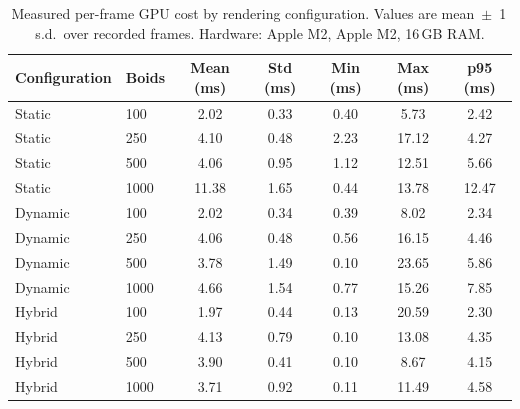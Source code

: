 \begin{table}[htbp]
  \centering
  \caption{Measured per-frame GPU cost by rendering configuration. Values are mean~$\pm$~1\,s.d.\ over recorded frames. Hardware: Apple M2, Apple M2, 16\,GB RAM.}
  \label{tab:frame-cost}
  \begin{tabular}{llccccc}
    \toprule
    \textbf{Configuration} & \textbf{Boids} & \textbf{Mean (ms)} & \textbf{Std (ms)} & \textbf{Min (ms)} & \textbf{Max (ms)} & \textbf{p95 (ms)} \\
    \midrule
    Static & 100 & 2.02 & 0.33 & 0.40 & 5.73 & 2.42 \\
    Static & 250 & 4.10 & 0.48 & 2.23 & 17.12 & 4.27 \\
    Static & 500 & 4.06 & 0.95 & 1.12 & 12.51 & 5.66 \\
    Static & 1000 & 11.38 & 1.65 & 0.44 & 13.78 & 12.47 \\
    Dynamic & 100 & 2.02 & 0.34 & 0.39 & 8.02 & 2.34 \\
    Dynamic & 250 & 4.06 & 0.48 & 0.56 & 16.15 & 4.46 \\
    Dynamic & 500 & 3.78 & 1.49 & 0.10 & 23.65 & 5.86 \\
    Dynamic & 1000 & 4.66 & 1.54 & 0.77 & 15.26 & 7.85 \\
    Hybrid & 100 & 1.97 & 0.44 & 0.13 & 20.59 & 2.30 \\
    Hybrid & 250 & 4.13 & 0.79 & 0.10 & 13.08 & 4.35 \\
    Hybrid & 500 & 3.90 & 0.41 & 0.10 & 8.67 & 4.15 \\
    Hybrid & 1000 & 3.71 & 0.92 & 0.11 & 11.49 & 4.58 \\
    \bottomrule
  \end{tabular}
\end{table}
